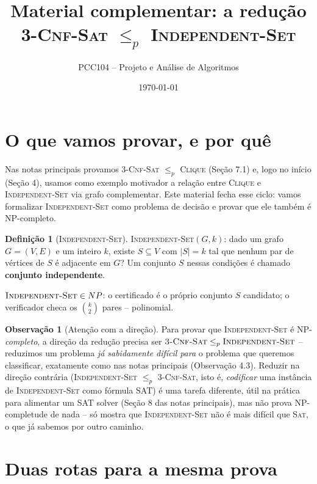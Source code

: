 \documentclass[9pt,a4paper]{extarticle}
\title{Material complementar: a redução \textsc{3-Cnf-Sat} \(\leq_p\) \textsc{Independent-Set}}
\author{PCC104 -- Projeto e Análise de Algoritmos}
\date{\today}
\newcommand{\impt}[1]{\textcolor{important}{\textbf{#1}}}
\theoremstyle{definition}
\newtheorem{definition}{Definição}[section]
\newtheorem{remark}{Observação}[section]
\begin{document}
\maketitle

\section{O que vamos provar, e por quê}

Nas notas principais provamos \textsc{3-Cnf-Sat} \(\leq_p\) \textsc{Clique} (Seção 7.1) e, logo no início (Seção 4), usamos como exemplo motivador a relação entre \textsc{Clique} e \textsc{Independent-Set} via grafo complementar. Este material fecha esse ciclo: vamos formalizar \textsc{Independent-Set} como problema de decisão e provar que ele também é NP-completo.

\begin{definition}[\textsc{Independent-Set}]
\textsc{Independent-Set}\((G,k)\): dado um grafo \(G=(V,E)\) e um inteiro \(k\), existe \(S \subseteq V\) com \(|S| = k\) tal que nenhum par de vértices de \(S\) é adjacente em \(G\)? Um conjunto \(S\) nessas condições é chamado \impt{conjunto independente}.
\end{definition}

\(\textsc{Independent-Set} \in NP\): o certificado é o próprio conjunto \(S\) candidato; o verificador checa os \(\binom{k}{2}\) pares -- polinomial.

\begin{remark}[Atenção com a direção]
Para provar que \textsc{Independent-Set} é NP-\emph{completo}, a direção da redução precisa ser \(\textsc{3-Cnf-Sat} \leq_p \textsc{Independent-Set}\) -- reduzimos um problema \emph{já sabidamente difícil} \emph{para} o problema que queremos classificar, exatamente como nas notas principais (Observação 4.3). Reduzir na direção contrária (\textsc{Independent-Set} \(\leq_p\) \textsc{3-Cnf-Sat}, isto é, \emph{codificar} uma instância de \textsc{Independent-Set} como fórmula SAT) é uma tarefa diferente, útil na prática para alimentar um SAT solver (Seção 8 das notas principais), mas não prova NP-completude de nada -- só mostra que \textsc{Independent-Set} não é mais difícil que \textsc{Sat}, o que já sabemos por outro caminho.
\end{remark}

\section{Duas rotas para a mesma prova}
\end{document}
